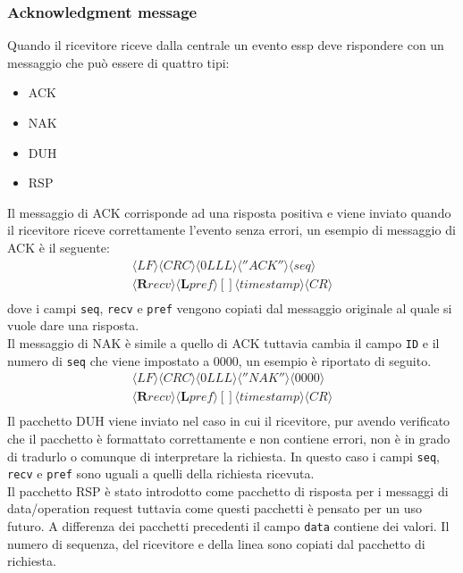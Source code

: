 \subsubsection{Acknowledgment message}
Quando il ricevitore riceve dalla centrale un evento essp deve rispondere con un messaggio che può essere di quattro tipi:
\begin{itemize}
	\item ACK
	\item NAK
	\item DUH
	\item RSP
\end{itemize}
Il messaggio di ACK corrisponde ad una risposta positiva e viene inviato quando il ricevitore riceve correttamente l'evento senza errori, un esempio di messaggio di ACK è il seguente:
$$
\begin{array}{c}
\langle LF\rangle\langle CRC\rangle\langle 0LLL\rangle\langle ''ACK''\rangle\langle seq\rangle\\\langle\textbf{R}recv\rangle\langle\textbf{L}pref\rangle
{[]}\langle timestamp\rangle \langle CR\rangle\\
\end{array}	 
$$
dove i campi \texttt{seq}, \texttt{recv} e \texttt{pref} vengono copiati dal messaggio originale al quale si vuole dare una risposta.\\
Il messaggio di NAK è simile a quello di ACK tuttavia cambia il campo \texttt{ID} e il numero di \texttt{seq} che viene impostato a 0000, un esempio è riportato di seguito.
$$
\begin{array}{c}
\langle LF\rangle\langle CRC\rangle\langle 0LLL\rangle\langle ''NAK''\rangle\langle 0000\rangle\\\langle\textbf{R}recv\rangle\langle\textbf{L}pref\rangle
{[]}\langle timestamp\rangle \langle CR\rangle\\
\end{array}	 
$$
Il pacchetto DUH viene inviato nel caso in cui il ricevitore, pur avendo verificato che il pacchetto è formattato correttamente e non contiene errori, non è in grado di tradurlo o comunque di interpretare la richiesta. In questo caso i campi \texttt{seq}, \texttt{recv} e \texttt{pref} sono uguali a quelli della richiesta ricevuta.\\
Il pacchetto RSP è stato introdotto come pacchetto di risposta per i messaggi di data/operation request tuttavia come questi pacchetti è pensato per un uso futuro. A differenza dei pacchetti precedenti il campo \texttt{data} contiene dei valori. Il numero di sequenza, del ricevitore e della linea sono copiati dal pacchetto di richiesta.
